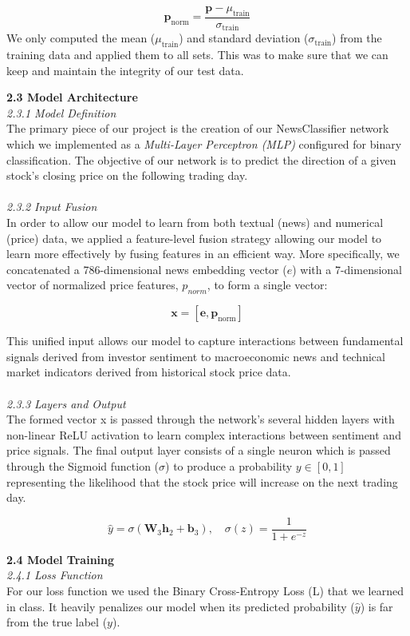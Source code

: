 \documentclass[letterpaper,12pt, twocolumn]{report}
\begin{document}
$$
\mathbf{p}_{\text{norm}} = \frac{\mathbf{p} - \mu_{\text{train}}}{\sigma_{\text{train}}}
$$
We only computed the mean ($\mu_{\text{train}}$) and standard deviation ($\sigma_{\text{train}}$) from the training data and applied them to all sets. This was to make sure that we can keep and maintain the integrity of our test data.

\noindent
\textbf{2.3 Model Architecture}\\
\noindent
\textit{2.3.1 Model Definition} \\
The primary piece of our project is the creation of our NewsClassifier network which we implemented as a \textit{Multi-Layer Perceptron (MLP)} configured for binary classification. The objective of our network is to predict the direction of a given stock’s closing price on the following trading day. \\\\
\textit{2.3.2 Input Fusion} \\
In order to allow our model to learn from both textual (news) and numerical (price) data, we applied a feature-level fusion strategy allowing our model to learn more effectively by fusing features in an efficient way. More specifically, we concatenated a  786-dimensional news embedding vector ($e$) with a 7-dimensional vector of normalized price features, $p_{norm}$, to form a single vector: 

$$
\mathbf{x} = [\mathbf{e}, \mathbf{p}_{\text{norm}}]
$$

\noindent
This unified input allows our model to capture interactions between fundamental signals derived from investor sentiment to macroeconomic news and technical market indicators derived from historical stock price data.\\\\
\textit{2.3.3 Layers and Output} \\
The formed vector x is passed through the network's several hidden layers with non-linear ReLU activation to learn complex interactions between sentiment and price signals. The final output layer consists of a single neuron which is passed through the Sigmoid function ($\sigma$) to produce a probability $y \in [0,1]$ representing the likelihood that the stock price will increase on the next trading day. 

$$
\hat{y} = \sigma(\mathbf{W}_3 \mathbf{h}_2 + \mathbf{b}_3), \quad \sigma(z) = \frac{1}{1 + e^{-z}}
$$

\noindent
\textbf{2.4 Model Training}\\
\textit{2.4.1 Loss Function}\\
For our loss function we used the Binary Cross-Entropy Loss (L) that we learned in class. It heavily penalizes our model when its predicted probability ($\hat{y}$) is far from the true label ($y$).\\
\end{document}
